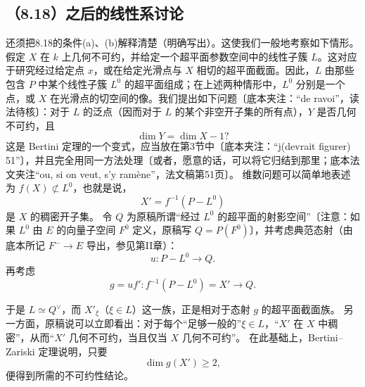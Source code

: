 \subsection*{（8.18）之后的线性系讨论}
还须把8.18的条件(a)、(b)解释清楚（明确写出）。这使我们一般地考察如下情形。假定 $X$ 在 $k$ 上几何不可约，并给定一个超平面参数空间中的线性子簇 $L$。这对应于研究经过给定点 $x$，或在给定光滑点与 $X$ 相切的超平面截面。因此，$L$ 由那些包含 $P$ 中某个线性子簇 $L^0$ 的超平面组成；在上述两种情形中，$L^0$ 分别是一个点，或 $X$ 在光滑点的切空间的像。我们提出如下问题〔底本夹注：“de ravoi”，读法待核〕：对于 $L$ 的泛点（因而对于 $L$ 的某个非空开子集的所有点），$Y$ 是否几何不可约，且
\[
\dim Y=\dim X-1?
\]
这是 Bertini 定理的一个变式，应当放在第3节中〔底本夹注：“j(devrait figurer) 51”〕，并且完全用同一方法处理〔或者，愿意的话，可以将它归结到那里；底本法文夹注“ou, si on veut, s'y ramène”，法文稿第51页〕。
维数问题可以简单地表述为 $f(X)\not\subset L^0$，也就是说，
\[
X'=f^{-1}(P-L^0)
\]
是 $X$ 的稠密开子集。
令 $Q$ 为原稿所谓“经过 $L^0$ 的超平面的射影空间”〔注意：如果 $L^0$ 由 $E$ 的向量子空间 $F^0$ 定义，原稿写 $Q=P(F^0)$〕，并考虑典范态射（由底本所记 $F^-\to E$ 导出，参见第II章）：
\[
u:P-L^0\longrightarrow Q.
\]
再考虑
\[
g=uf':f^{-1}(P-L^0)=X'\longrightarrow Q.
\]

于是 $L\simeq Q^\vee$，而 $X'_\xi$（$\xi\in L$）这一族，正是相对于态射 $g$ 的超平面截面族。
另一方面，原稿说可以立即看出：对于每个“足够一般的”$\xi\in L$，“$X'$ 在 $X$ 中稠密”，从而“$X'$ 几何不可约，当且仅当 $X$ 几何不可约”。
在此基础上，Bertini--Zariski 定理说明，只要
\[
\dim g(X')\ge2,
\]
便得到所需的不可约性结论。


